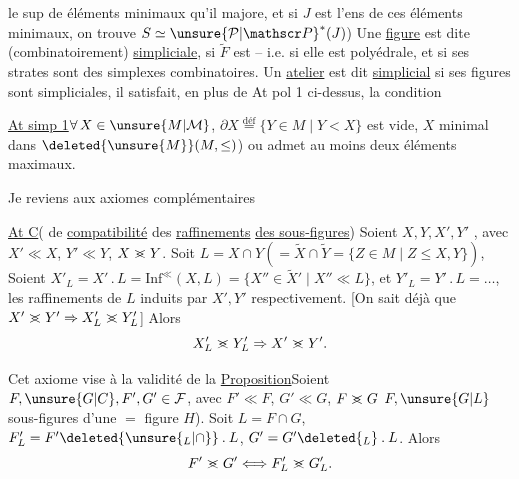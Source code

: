 le sup de  éléments minimaux qu'il majore, et si $J$ est l'ens de ces éléments minimaux, on trouve $S\simeq{\unsure{\mathcal{P}|\mathscr P}}^{*}(J)$)
Une \uline{figure}  est dite (combinatoirement) \uline{simpliciale}, si $\widetilde F$ est  -- i.e. si elle est polyédrale, et si ses strates sont des simplexes combinatoires. Un \uline{atelier} est dit  \uline{simplicial} si  ses figures sont simpliciales,  il satisfait, en plus de At pol 1 ci-dessus, la condition

\uline{At simp 1}\quad $\forall\,X\in\unsure{M|\mathcal M}$,   $\partial X\overset{\mathrm{déf}}{=}\{Y\in M\mid Y<X\}$ est vide,   $X$ minimal dans $\deleted{\unsure{M}}(M,\leq)$) ou admet au moins deux éléments maximaux.

Je reviens aux axiomes complémentaires

\uline{At C}\quad ( de \uline{compatibilité} des \uline{raffinements} \uline{des sous-figures}) Soient $X,Y,X',Y'$ , avec $X'\ll X$, $Y'\ll Y$, $X\mathrel{>\mkern-12mu<}Y$. Soit $L=X\cap Y\left(=\widetilde X\cap\widetilde Y=\{Z\in M\mid Z\leq X,Y\}\right)$, Soient
$X'_L=X'\mathbin{.}L=\mathrm{Inf}^{\ll}(X,L)=\{X''\in\widetilde X'\mid X''\ll L\}$, et $Y'_L=Y'\mathbin{.}L=\ldots$, les raffinements de $L$ induits par $X',Y'$ respectivement.  [On sait déjà que $X'\mathrel{>\mkern-12mu<}Y'\Rightarrow X'_L\mathrel{>\mkern-12mu<}Y'_L$] Alors
\[
X'_L\mathrel{>\mkern-12mu<}Y'_L\Rightarrow X'\mathrel{>\mkern-12mu<}Y'.
\]

Cet axiome vise à la validité de la
\uline{Proposition}\quad Soient $F,\unsure{G|C},F',G'\in\mathcal{F}$, avec $F'\ll F$, $G'\ll G$, $F\mathrel{>\mkern-12mu<}G$  $F,\unsure{G|L}$ sous-figures d'une $=$ figure $H$). Soit $L=F\cap G$, $F'_L=F'\deleted{\unsure{{}_L|\cap}}\mathbin{.}L$, $G'=G'\deleted{{}_L}\mathbin{.}L$. Alors
\[
F'\mathrel{>\mkern-12mu<}G'\Longleftrightarrow F'_L\mathrel{>\mkern-12mu<}G'_L.
\]
